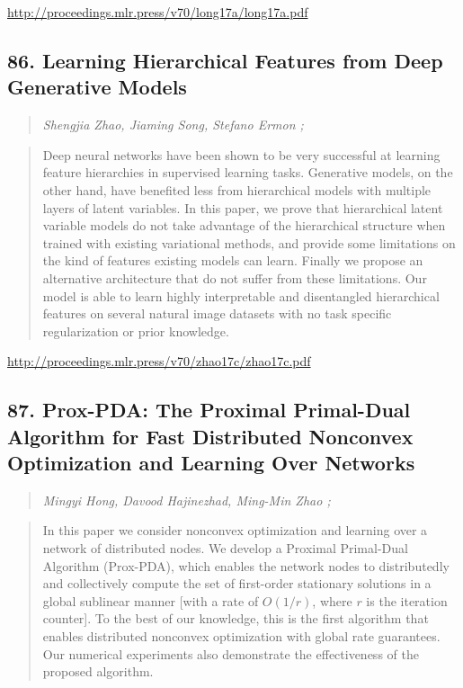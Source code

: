 \documentclass{article}
\begin{document}
\href{http://proceedings.mlr.press/v70/long17a/long17a.pdf}{http://proceedings.mlr.press/v70/long17a/long17a.pdf}

\subsection{86. Learning Hierarchical Features from Deep Generative Models}

\begin{quote}
\footnotesize{\textit{Shengjia Zhao, Jiaming Song, Stefano Ermon ;}}

\end{quote}

\begin{quote}
    Deep neural networks have been shown to be very successful at learning feature hierarchies in supervised learning tasks. Generative models, on the other hand, have benefited less from hierarchical models with multiple layers of latent variables. In this paper, we prove that hierarchical latent variable models do not take advantage of the hierarchical structure when trained with existing variational methods, and provide some limitations on the kind of features existing models can learn. Finally we propose an alternative architecture that do not suffer from these limitations. Our model is able to learn highly interpretable and disentangled hierarchical features on several natural image datasets with no task specific regularization or prior knowledge.  
\end{quote}

\href{http://proceedings.mlr.press/v70/zhao17c/zhao17c.pdf}{http://proceedings.mlr.press/v70/zhao17c/zhao17c.pdf}

\subsection{87. Prox-PDA: The Proximal Primal-Dual Algorithm for Fast Distributed Nonconvex Optimization and Learning Over Networks}

\begin{quote}
\footnotesize{\textit{Mingyi Hong, Davood Hajinezhad, Ming-Min Zhao ;}}

\end{quote}

\begin{quote}
    In this paper we consider nonconvex optimization and learning over a network of distributed nodes. We develop a Proximal Primal-Dual Algorithm (Prox-PDA), which enables the network nodes to distributedly and collectively compute the set of first-order stationary solutions in a global sublinear manner [with a rate of $O(1/r)$, where $r$ is the iteration counter]. To the best of our knowledge, this is the first algorithm that enables distributed nonconvex optimization with global rate guarantees. Our numerical experiments also demonstrate the effectiveness of the proposed algorithm.  
\end{quote}
\end{document}
